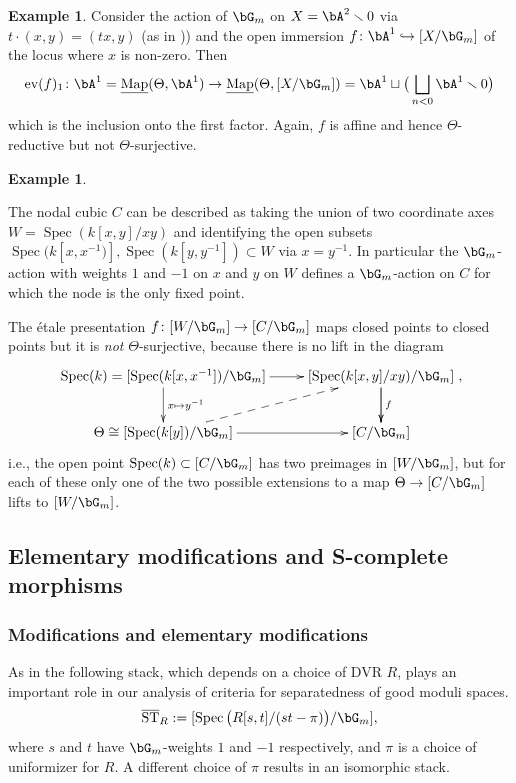 \documentclass[a4paper]{amsart}
\numberwithin{equation}{section}
\theoremstyle{plain}
\theoremstyle{definition}
\newtheorem{example}[thm]{Example}
\DeclareMathOperator{\Spec}{Spec}
\DeclareMathOperator{\ST}{ST}
\DeclareMathOperator{\ev}{ev}
\newcommand{\hookarr}{\hookrightarrow}
\newcommand{\uMap}{\underline{{\rm Map}}}
\newcommand{\co}{\colon}
\def\oST{\overline{\ST}}
\begin{document}
\begin{example} \label{E:relative2}
	 Consider the action of $\bG_m$ on $X=\bA^2 \smallsetminus 0$ via $t \cdot (x,y) = (tx, y)$ (as in )) and the open immersion $f \co \bA^1 \hookarr  [X/\bG_m]$
of the locus where $x$ is non-zero.  Then
	 $$\ev(f)_1 \co \bA^1 = \uMap(\Theta,\bA^1) \to \uMap(\Theta,[X/\bG_m]) =  \bA^1 \sqcup \big( \bigsqcup_{n < 0}  \bA^1 \smallsetminus 0 \big) $$
	 which is the inclusion onto the first factor.  Again, $f$ is affine and hence $\Theta$-reductive but not $\Theta$-surjective.
\end{example}





\begin{example} \label{E:relative5}
	{The nodal cubic  $C$ can be described as taking the union of two coordinate axes $W=\Spec(k[x,y]/xy)$ and identifying the open subsets $\Spec(k[x,x^{-1})], \Spec(k[y,y^{-1}])\subset W$ via $x=y^{-1}$. In particular the $\bG_m$-action with weights $1$ and $-1$ on $x$ and $y$ on $W$ defines a $\bG_m$-action on $C$ for which the node is the only fixed point.
		
 The étale presentation $f\colon [W/\bG_m]\to [C/\bG_m]$ maps closed points to closed points but it is \emph{not} $\Theta$-surjective, because there is no lift in the diagram
$$\xymatrix{
\Spec(k)=[\Spec(k[x,x^{-1}])/\bG_m] \ar[r] \ar[d]^{x\mapsto y^{-1}}	& [\Spec( k[x,y]/xy) / \bG_m]  \ar[d]^{f}
\ar[d]\\
\Theta\cong[\Spec(k[y])/\bG_m] \ar[r] \ar@{-->}[ur]	& [C/\bG_m]
},$$
i.e., the open point $\Spec(k)\subset [C/\bG_m]$ has two preimages in $[W/\bG_m]$, but for each of these only one of the two possible extensions to a map $\Theta \to [C/\bG_m]$ lifts to $[W/\bG_m]$.}
\end{example}

\subsection{Elementary modifications and  {\textsf{S}}-complete morphisms}

\subsubsection{Modifications and elementary modifications}

As in \cite[\S 2.B]{heinloth-stability} the following stack, which depends on a choice of DVR $R$, plays an important role in our analysis of criteria for separatedness of good moduli spaces.
\begin{equation} \label{E:ST}
\oST_R := [\Spec \big(R[s,t] / (st-\pi)\big)  / \bG_m],
\end{equation}
where $s$ and $t$ have $\bG_m$-weights $1$ and $-1$ respectively, and $\pi$ is a choice of uniformizer for $R$. A different choice of $\pi$ results in an isomorphic stack. 
\end{document}
